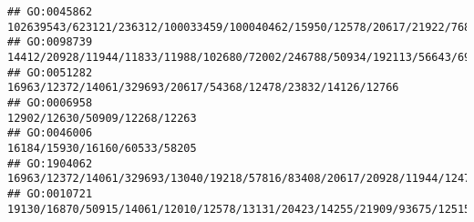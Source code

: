 \documentclass[
]{article}
\begin{document}
\begin{verbatim}
## GO:0045862                                                                                                                                                                                                                                                                                   102639543/623121/236312/100033459/100040462/15950/12578/20617/21922/76884/18053/18095/54483/30060/19876/15511/193740/11551
## GO:0098739                                                                                                                                                                                                                                                                                                                             14412/20928/11944/11833/11988/102680/72002/246788/50934/192113/56643/69354/12482
## GO:0051282                                                                                                                                                                                                                                                                                                                                                 16963/12372/14061/329693/20617/54368/12478/23832/14126/12766
## GO:0006958                                                                                                                                                                                                                                                                                                                                                                                12902/12630/50909/12268/12263
## GO:0046006                                                                                                                                                                                                                                                                                                                                                                                16184/15930/16160/60533/58205
## GO:1904062                                                                                                                                                                                                                                                                                                 16963/12372/14061/329693/13040/19218/57816/83408/20617/20928/11944/12478/81897/14169/14419/12482/14126/12766
## GO:0010721                                                                                                                                                                                                                                                                                                        19130/16870/50915/14061/12010/12578/13131/20423/14255/21909/93675/12515/17751/20666/57757/16149/20371

\end{verbatim}
\end{document}
